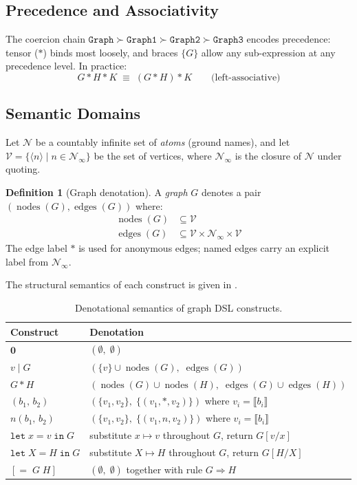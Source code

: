 \documentclass[11pt, a4paper]{article}
\theoremstyle{definition}
\newtheorem{definition}{Definition}[section]
\theoremstyle{plain}
\theoremstyle{remark}
\newcommand{\edges}{\operatorname{edges}}
\newcommand{\nodes}{\operatorname{nodes}}
\newcommand{\GNil}{\mathbf{0}}
\newcommand{\tensor}{\mathbin{*}}
\begin{document}
\subsection{Precedence and Associativity}

The coercion chain $\mathtt{Graph} \succ \mathtt{Graph1} \succ \mathtt{Graph2}
\succ \mathtt{Graph3}$ encodes precedence: tensor ($*$) binds most loosely, and
braces $\{G\}$ allow any sub-expression at any precedence level.  In practice:
\[
  G * H * K \;\equiv\; (G * H) * K
  \qquad\text{(left-associative)}
\]

\subsection{Semantic Domains}

Let $\mathcal{N}$ be a countably infinite set of \emph{atoms} (ground names),
and let $\mathcal{V} = \{ \langle n \rangle \mid n \in \mathcal{N}_\infty \}$
be the set of vertices, where $\mathcal{N}_\infty$ is the closure of
$\mathcal{N}$ under quoting.

\begin{definition}[Graph denotation]
\label{def:denotation}
A \emph{graph} $G$ denotes a pair $(\nodes(G), \edges(G))$ where:
\begin{align*}
  \nodes(G) &\subseteq \mathcal{V}\\
  \edges(G) &\subseteq \mathcal{V} \times \mathcal{N}_\infty \times \mathcal{V}
\end{align*}
The edge label $*$ is used for anonymous edges; named edges carry an explicit
label from $\mathcal{N}_\infty$.
\end{definition}

The structural semantics of each construct is given in .

\begin{table}[ht]
\centering
\caption{Denotational semantics of graph DSL constructs.}
\label{tab:semantics}
\renewcommand{\arraystretch}{1.4}
\begin{tabular}{@{} l l @{}}
\toprule
\textbf{Construct} & \textbf{Denotation} \\
\midrule
$\GNil$ & $(\emptyset,\; \emptyset)$ \\
$v \mid G$ & $(\{v\} \cup \nodes(G),\; \edges(G))$ \\
$G \tensor H$ & $(\nodes(G)\cup\nodes(H),\; \edges(G)\cup\edges(H))$ \\
$(b_1,\, b_2)$ & $(\{v_1,v_2\},\; \{(v_1,*,v_2)\})$ where $v_i=\llbracket b_i\rrbracket$ \\
$n(b_1,\, b_2)$ & $(\{v_1,v_2\},\; \{(v_1,n,v_2)\})$ where $v_i=\llbracket b_i\rrbracket$ \\
$\texttt{let}\; x = v\; \texttt{in}\; G$ & substitute $x \mapsto v$ throughout $G$, return $G[v/x]$ \\
$\texttt{let}\; X = H\; \texttt{in}\; G$ & substitute $X \mapsto H$ throughout $G$, return $G[H/X]$ \\
$[{=}\; G\; H]$ & $(\emptyset,\; \emptyset)$ together with rule $G \Rightarrow H$ \\
\bottomrule
\end{tabular}
\end{table}
\end{document}
